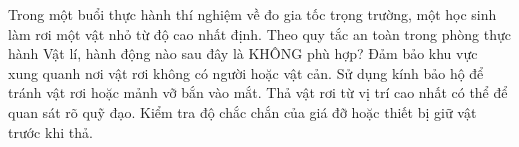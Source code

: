 \begin{ex}
Trong một buổi thực hành thí nghiệm về đo gia tốc trọng trường, một học sinh làm rơi một vật nhỏ từ độ cao nhất định. Theo quy tắc an toàn trong phòng thực hành Vật lí, hành động nào sau đây là KHÔNG phù hợp?
\choice
{Đảm bảo khu vực xung quanh nơi vật rơi không có người hoặc vật cản.}
{Sử dụng kính bảo hộ để tránh vật rơi hoặc mảnh vỡ bắn vào mắt.}
{\True Thả vật rơi từ vị trí cao nhất có thể để quan sát rõ quỹ đạo.}
{Kiểm tra độ chắc chắn của giá đỡ hoặc thiết bị giữ vật trước khi thả.}
\end{ex}

